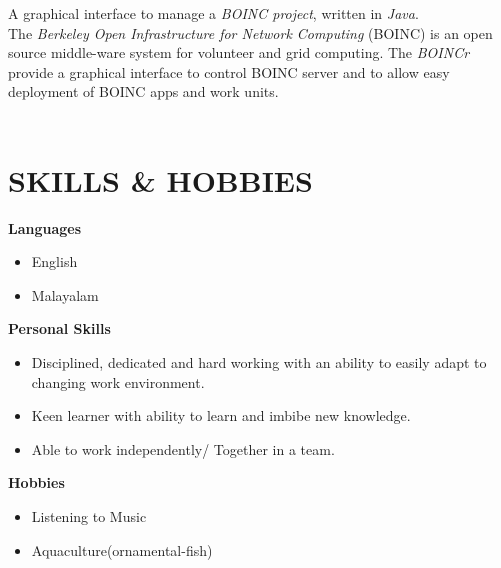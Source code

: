 \documentclass[line,margin]{res}
\begin{document}
\begin{resume}
	     		A graphical interface to manage a {\it BOINC project}, written in {\it Java}.\\
	     		The {\it Berkeley Open Infrastructure for Network Computing }(BOINC) is an open source middle-ware system for volunteer and grid computing. The {\it BOINCr} provide a graphical interface to control BOINC server and to allow easy deployment of BOINC apps and work units.\\\\	
	
	    \section{SKILLS \& HOBBIES}
	        {\bf Languages}
	        \begin{itemize} \itemsep -2pt
	        \item English
	        \item Malayalam
	        \end{itemize}
	        {\bf Personal Skills}
	        \begin{itemize} \itemsep -2pt
	        \item Disciplined, dedicated and hard working with an ability to easily adapt to changing work environment.
	        \item Keen learner with ability to learn and imbibe new knowledge.
	        \item Able to work independently/ Together in a team.
	        \end{itemize}
	        {\bf Hobbies}
	        \begin{itemize} \itemsep -2pt
	        \item Listening to Music
	        \item Aquaculture(ornamental-fish)
	        \end{itemize}
	\vspace{10 mm}                                 

\end{resume}
\end{document}
